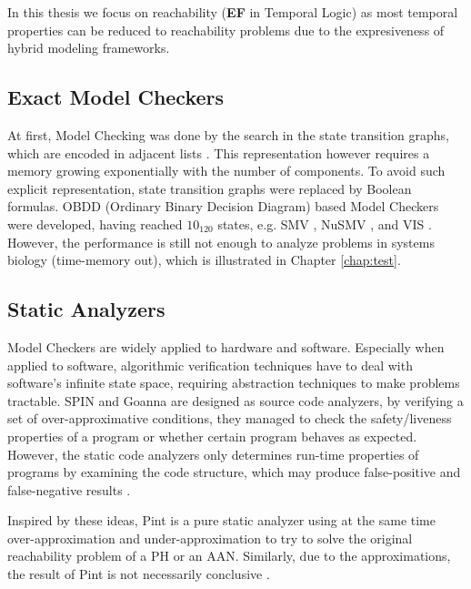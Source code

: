 In this thesis we focus on reachability (\textbf{EF} in Temporal Logic) as most temporal properties can be reduced to reachability problems due to the expresiveness of hybrid modeling frameworks.

\subsection{Exact Model Checkers}
At first, Model Checking was done by the search in the state transition graphs, which are encoded in adjacent lists \cite{clarke1981design}.
This representation however requires a memory growing exponentially with the number of components.
To avoid such explicit representation, state transition graphs were replaced by Boolean formulas.
OBDD (Ordinary Binary Decision Diagram) based Model Checkers were developed, having reached $10_{120}$ states, e.g.
SMV \cite{mcmillan1993symbolic}, NuSMV \cite{cimatti2000nusmv}, and VIS \cite{brayton1996vis}.
However, the performance is still not enough to analyze problems in systems biology (time-memory out), which is illustrated in Chapter \ref{chap:test}.  

\subsection{Static Analyzers}
Model Checkers are widely applied to hardware and software.
Especially when applied to software, algorithmic verification techniques have
to deal with software’s infinite state space, requiring abstraction techniques to make problems tractable.
SPIN \cite{holzmann1997model} and Goanna \cite{fehnker2006goanna} are designed as source code analyzers, by verifying a set of over-approximative conditions, they managed to check the safety/liveness properties of a program or whether certain program behaves as expected. 
However, the static code analyzers only determines run-time properties of programs by examining the code structure, which may produce false-positive and false-negative results \cite{vorobyov2010comparing}.

Inspired by these ideas, Pint \cite{Pint}  is a pure static analyzer using at the same time over-approximation and under-approximation to try to solve the original reachability problem of a PH or an AAN.
Similarly, due to the approximations, the result of Pint is not necessarily conclusive \cite{folschette2015}.

